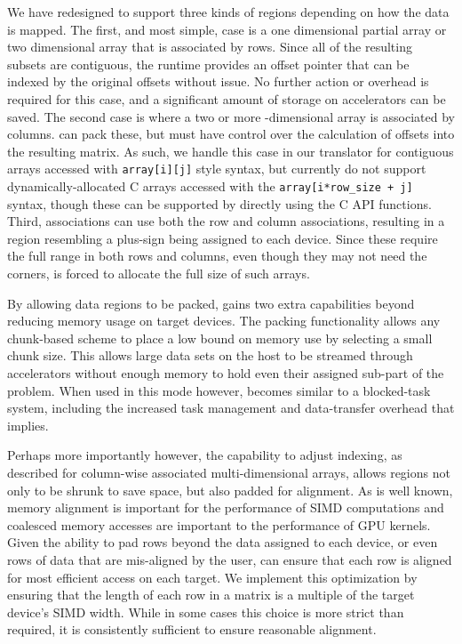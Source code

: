 We have redesigned \tsar to support three kinds of regions depending on how
the data is mapped.  The first, and most simple, case is a one dimensional
partial array or two dimensional array that is associated by rows.  Since all
of the resulting subsets are contiguous, the runtime provides an offset
pointer that can be indexed by the original offsets without issue.  No further
action or overhead is required for this case, and a significant amount of
storage on accelerators can be saved.  The second case is where a two or more
-dimensional array is associated by columns.  \tsar can pack these, but must
have control over the calculation of offsets into the resulting matrix.  As
such, we handle this case in our translator for contiguous arrays accessed
with \verb#array[i][j]# style syntax, but currently do not support 
dynamically-allocated C arrays accessed with the \verb#array[i*row_size + j]# 
syntax, though these can be supported by directly using the C API functions.  
Third, associations can use both the row and column associations, resulting 
in a region resembling a plus-sign being assigned to each device.  Since these
require the full range in both rows and columns, even though they may not need
the corners, \tsar is forced to allocate the full size of such arrays.

By allowing data regions to be packed, \tsar gains two extra capabilities
beyond reducing memory usage on target devices.  The packing functionality
allows any chunk-based scheme to place a low bound on memory use by
selecting a small chunk size. This allows large data sets on the host to
be streamed through accelerators without enough memory to hold even their
assigned sub-part of the problem.  When used in this mode however, \tsar
becomes similar to a blocked-task system, including the increased task
management and data-transfer overhead that implies.

Perhaps more importantly however, the capability to adjust indexing, as
described for column-wise associated multi-dimensional arrays, allows regions
not only to be shrunk to save space, but also padded for alignment. As is
well known, memory alignment is important for the performance of
SIMD computations and coalesced memory accesses are important
to the performance of GPU kernels.  Given the ability to pad rows beyond the
data assigned to each device, or even rows of data that are mis-aligned by the
user, \tsar can ensure that each row is aligned for most efficient access on
each target. We implement this optimization by ensuring that the length of
each row in a matrix is a multiple of the target device's SIMD width.  While
in some cases this choice is more strict than required, it is consistently
sufficient to ensure reasonable alignment.

